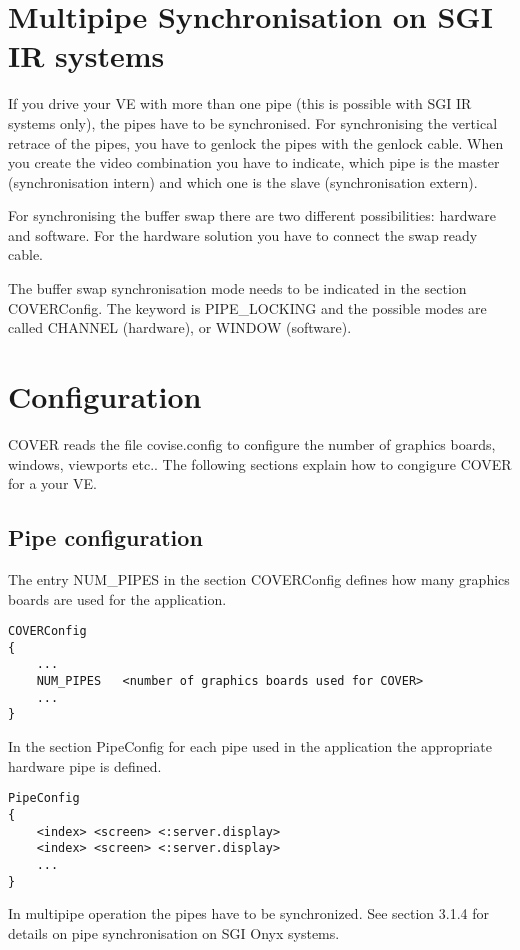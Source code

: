 \section{Multipipe Synchronisation on SGI IR systems}
\label{label_section_multipe_sync}

If you drive your VE with more than one pipe (this is possible with
SGI IR systems only), the pipes have to be synchronised. For
synchronising the vertical retrace of the pipes, you have to genlock
the pipes with the genlock cable. When you create the video combination
you have to indicate, which pipe is the master (synchronisation intern)
and which one is the slave (synchronisation extern).

For synchronising the buffer swap
there are two different possibilities: hardware and software. For the
hardware solution you have to connect the swap ready cable.

The buffer swap synchronisation mode needs to be indicated in the section
COVERConfig. The keyword is PIPE\_LOCKING and the possible modes are called
CHANNEL (hardware), or WINDOW (software). 

\section{Configuration}
\label{label_section_configuration}
COVER reads the file covise.config to configure the number of
graphics boards, windows, viewports etc..
The following sections explain how to congigure COVER for a your VE.

\subsection{Pipe configuration}
The entry NUM\_PIPES in the section COVERConfig defines how many graphics 
boards are used for the application. 
\small
\small \begin{verbatim}
COVERConfig
{
    ...
    NUM_PIPES	<number of graphics boards used for COVER>
    ...
}
\end{verbatim}
\normalsize
In the section PipeConfig for each pipe used in the application
the appropriate hardware pipe is defined.
\begin{samepage}
\small
\small \begin{verbatim}
PipeConfig
{
    <index> <screen> <:server.display>
    <index> <screen> <:server.display>
    ...
}
\end{verbatim}
\end{samepage}
\normalsize
In multipipe operation the pipes have to be synchronized. See section 3.1.4
for details on pipe synchronisation on SGI Onyx systems.

